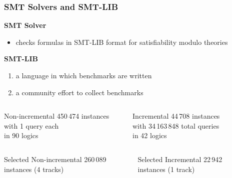 \documentclass[table]{beamer}
\def\emph#1{\textcolor{MYblue}{#1}}
\begin{document}
\begin{frame}
  \frametitle{SMT Solvers and SMT-LIB}
  \textbf{SMT Solver}
  \begin{itemize}
  \item checks formulas
    in \emph{SMT-LIB} format
    for \emph{satisfiability modulo theories}
  \end{itemize}
  \bigskip

  \textbf{SMT-LIB}
  \begin{enumerate}
  \item a \emph{language} in which benchmarks are written
  \item a community effort to \emph{collect benchmarks}
  \end{enumerate}
  \medskip

  \begin{columns}
    \begin{column}{0.4\textwidth}
      \begin{block}{Non-incremental}
        450\,474 instances \\
        with 1 query each \\
        in 90 logics
      \end{block}
    \end{column}
    \begin{column}{0.4\textwidth}
      \begin{block}{Incremental}
        44\,708 instances \\
        with 34\,163\,848 total queries \\
        in 42 logics
      \end{block}
    \end{column}
    \begin{column}{0.08\textwidth}
    \end{column}
  \end{columns}
  \pause
    \begin{columns}
    \begin{column}{0.4\textwidth}
      \begin{block}{Selected Non-incremental}
        260\,089 instances (4 tracks)
      \end{block}
    \end{column}
    \begin{column}{0.4\textwidth}
      \begin{block}{Selected Incremental}
        22\,942 instances (1 track)
      \end{block}
    \end{column}
    \begin{column}{0.08\textwidth}
    \end{column}
  \end{columns}

\end{frame}
\end{document}
